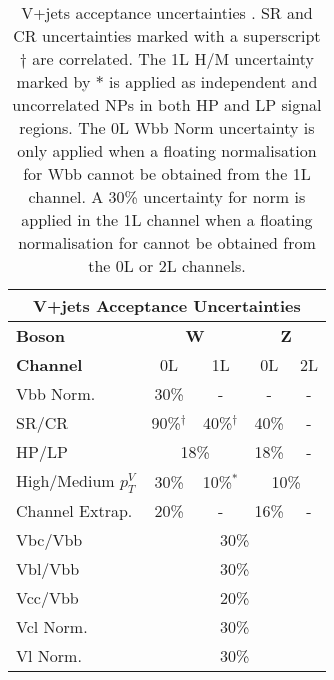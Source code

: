 \begin{table}[!htbp] 
  \footnotesize\centering
  \setlength{\tabcolsep}{0.5em} %
  \begin{tabular}{l|c|c|c|c}
      \toprule\hline
      \multicolumn{5}{c}{V+jets Acceptance Uncertainties}            
      \\ \hline
      \textbf{Boson}      & \multicolumn{2}{c|}{\textbf{W}} & \multicolumn{2}{c}{\textbf{Z}} 
      \\ \hline
      \textbf{Channel}    & 0L          & 1L         & 0L         & 2L          
      \\ \hline
      Vbb Norm.           &   30\%      &     -      &     -      &          -  
      \\ \hline
      SR/CR               &   90\%$^\dagger$         & 40\%$^\dagger$ &      40\%     & -         
      \\ \hline
      HP/LP               & \multicolumn{2}{c|}{18\%}             &   18\%      & -         
      \\ \hline
      High/Medium $p_T^V$ &   30\%      & 10\%$^*$       & \multicolumn{2}{c}{10\%}          
      \\ \hline
      Channel Extrap.             &   20\%      &   -        &    16\%    & -
      \\ \hline
      Vbc/Vbb             & \multicolumn{4}{c}{30\%}                       
      \\ \hline
      Vbl/Vbb             & \multicolumn{4}{c}{30\%}                       
      \\ \hline
      Vcc/Vbb             & \multicolumn{4}{c}{20\%}                       
      \\ \hline
      Vcl Norm.           & \multicolumn{4}{c}{30\%}                       
      \\ \hline
      Vl Norm.            & \multicolumn{4}{c}{30\%}                       
      \\ \hline\bottomrule
  \end{tabular}
  \caption{
    V+jets acceptance uncertainties \cite{Dao:2688371}.
    \Wjets SR and CR uncertainties marked with a superscript $\dagger$ are correlated.
    The 1L \Wjets H/M uncertainty marked by $*$ is applied as independent and uncorrelated NPs in both HP and LP signal regions.
    The 0L \Wjets Wbb Norm uncertainty is only applied when a floating normalisation for Wbb cannot be obtained from the 1L channel.
    A 30\% uncertainty for \Zbb norm is applied in the 1L channel when a floating normalisation for \Zbb cannot be obtained from the 0L or 2L channels.
  }
  \label{tab:Vjets acceptance uncerts}
\end{table}